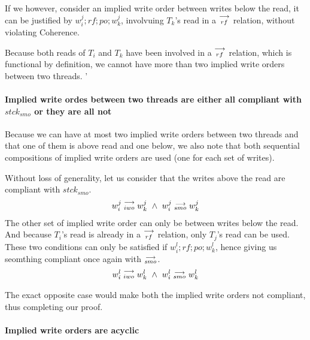 
        If we however, consider an implied write order between writes below the read, it can be justified by  $w_i^j;rf;po;w_k^j$, involvuing $T_k$'s read in a $\stackrel{\longrightarrow}{_{rf}}$ relation, without violating Coherence. 

        Because both reads of $T_i$ and $T_k$ have been involved in a $\stackrel{\longrightarrow}{_{rf}}$ relation, which is functional by definition, we cannot have more than two implied write orders between two threads. '
        
        
    \paragraph{Implied write ordes between two threads are either all compliant with $stck{_{smo}}$ or they are all not}

        Because we can have at most two implied write orders between two threads and that one of them is above read and one below, we also note that both sequential compositions of implied write orders are used (one for each set of writes). 
        
        Without loss of generality, let us consider that the writes above the read are compliant with $stck{_{smo}}$. 
        \begin{align}
            w_i^j\stackrel{\longrightarrow}{_{iwo}}w_k^j \ \wedge \ w_i^j\stackrel{\longrightarrow}{_{smo}}w_k^j
        \end{align}
        The other set of implied write order can only be between writes below the read. And because $T_i$'s read is already in a $\stackrel{\longrightarrow}{_{rf}}$ relation, only $T_j$'s read can be used. These two conditions can only be satisfied if $w_i^l;rf;po;w_k^l$, hence giving us seomthing compliant once again with $\stackrel{\longrightarrow}{_{smo}}$.
        \begin{align}
            w_i^l\stackrel{\longrightarrow}{_{iwo}}w_k^l \ \wedge \ w_i^l\stackrel{\longrightarrow}{_{smo}}w_k^l
        \end{align}

        The exact opposite case would make both the implied write orders not compliant, thus completing our proof. 



    \paragraph{Implied write orders are acyclic}

